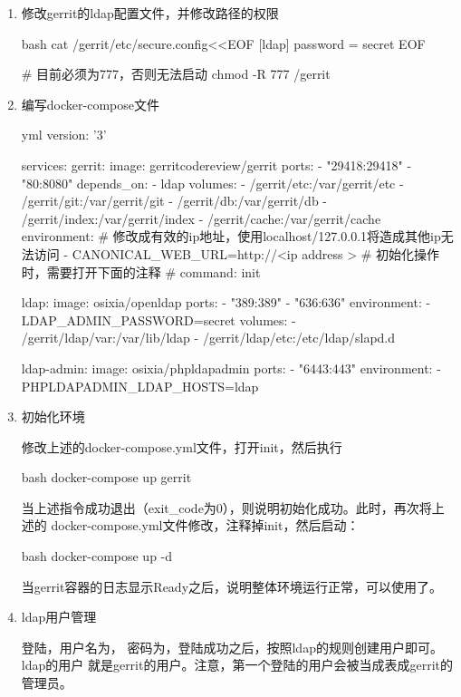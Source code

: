 \begin{enumerate}
  \item 修改gerrit的ldap配置文件，并修改路径的权限

  \begin{code-block}{bash}
  cat /gerrit/etc/secure.config<<EOF
  [ldap]
    password = secret
  EOF

  # 目前必须为777，否则无法启动
  chmod -R 777 /gerrit
  \end{code-block}

  \item 编写docker-compose文件

  \begin{code-block}{yml}
  version: '3'

  services:
    gerrit:
      image: gerritcodereview/gerrit
      ports:
        - "29418:29418"
        - "80:8080"
      depends_on:
        - ldap
      volumes:
        - /gerrit/etc:/var/gerrit/etc
        - /gerrit/git:/var/gerrit/git
        - /gerrit/db:/var/gerrit/db
        - /gerrit/index:/var/gerrit/index
        - /gerrit/cache:/var/gerrit/cache
      environment:
        # 修改成有效的ip地址，使用localhost/127.0.0.1将造成其他ip无法访问
        - CANONICAL_WEB_URL=http://<ip address >
      # 初始化操作时，需要打开下面的注释
      # command: init

    ldap:
      image: osixia/openldap
      ports:
        - "389:389"
        - "636:636"
      environment:
        - LDAP_ADMIN_PASSWORD=secret
      volumes:
        - /gerrit/ldap/var:/var/lib/ldap
        - /gerrit/ldap/etc:/etc/ldap/slapd.d

    ldap-admin:
      image: osixia/phpldapadmin
      ports:
        - "6443:443"
      environment:
        - PHPLDAPADMIN_LDAP_HOSTS=ldap
  \end{code-block}

  \item 初始化环境

  修改上述的docker-compose.yml文件，打开init，然后执行
  \begin{code-block}{bash}
  docker-compose up gerrit
  \end{code-block}
  当上述指令成功退出（exit\_code为0），则说明初始化成功。此时，再次将上述的
  docker-compose.yml文件修改，注释掉init，然后启动：
  \begin{code-block}{bash}
  docker-compose up -d
  \end{code-block}
  当gerrit容器的日志显示Ready之后，说明整体环境运行正常，可以使用了。

  \item ldap用户管理

  登陆，用户名为，
  密码为，登陆成功之后，按照ldap的规则创建用户即可。ldap的用户
  就是gerrit的用户。注意，第一个登陆的用户会被当成表成gerrit的管理员。

\end{enumerate}


